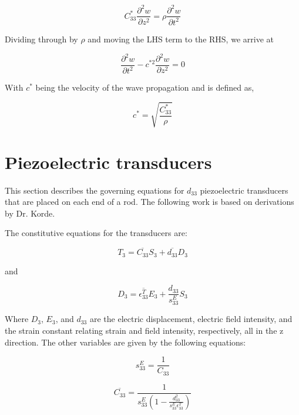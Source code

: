 \begin{equation}
C^*_{33}\frac{\partial ^2w}{\partial z^2} = \rho \frac{\partial ^2w}{\partial t^2}
\end{equation}

Dividing through by $\rho$ and moving the LHS term to the RHS, we arrive at

\begin{equation}
\frac{\partial ^2w}{\partial t^2} - c^{*2} \frac{\partial ^2w}{\partial z^2} = 0
\label{eq:waveEquationFin}
\end{equation}


With $c^*$ being the velocity of the wave propagation and is defined as,

\begin{equation}
c^* = \sqrt{\frac{C^*_{33}}{\rho}}
\end{equation}

\section{Piezoelectric transducers}

This section describes the governing equations for $d_{33}$ piezoelectric transducers that are placed on each end of a rod. The following work is based on derivations by Dr. Korde.

The constitutive equations for the transducers are:

\begin{equation}
T_3 = \overline{C_{33}} S_3 + \overline{d_{33}} D_3
\end{equation}

and 

\begin{equation}
D_3 = \overline{\epsilon ^T_{33}} E_3 + \frac{d_{33}}{s^E_{33}} S_3
\end{equation}

Where $D_3$, $E_3$, and $d_{33}$ are the electric displacement, electric field intensity, and the strain constant relating strain and field intensity, respectively, all in the z direction. The other variables are given by the following equations:

\begin{equation}
s^E_{33} = \frac{1}{C_{33}}
\end{equation}

\begin{equation}
\overline{C_{33}} = \frac{1}{s^E_{33}(1 - \frac{d^2_{33}}{s^E_{33}\epsilon ^T_{33}})}
\end{equation}

